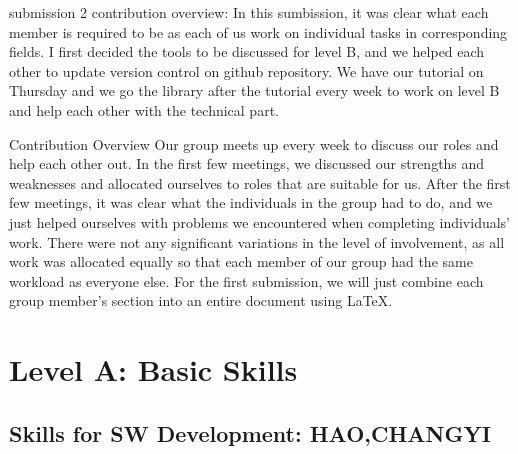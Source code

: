 \documentclass[a4paper, 11pt]{report}
\begin{document}
\begin{itemize}
submission 2 contribution overview: In this sumbission, it was clear what each member is required to be as each of us work on individual tasks in corresponding fields. I first decided the tools to be discussed for level B, and we helped each other to update version control on github repository. We have our tutorial on Thursday and we go the library after the tutorial every week to work on level B and help each other with the technical part.

\end{itemize}
Contribution Overview
Our group meets up every week to discuss our roles and help each other out. In the first few meetings, we discussed our strengths and weaknesses and allocated ourselves to roles that are suitable for us. After the first few meetings, it was clear what the individuals in the group had to do, and we just helped ourselves with problems we encountered when completing individuals’ work. There were not any significant variations in the level of involvement, as all work was allocated equally so that each member of our group had the same workload as everyone else. For the first submission, we will just combine each group member's section into an entire document using LaTeX.


\newpage
\section{Level A: Basic Skills}
\subsection{Skills for SW Development: HAO,CHANGYI}
\end{document}
